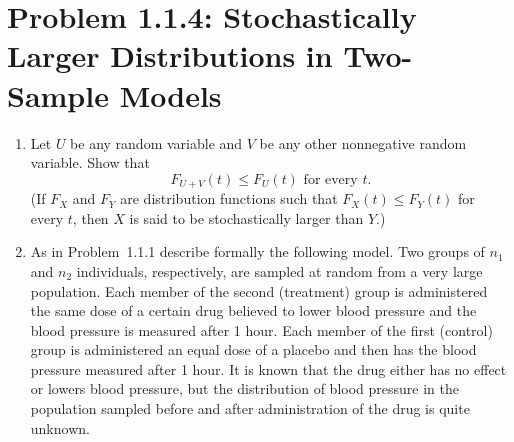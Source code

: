 \documentclass{amsbook}
\theoremstyle{definition}
\theoremstyle{remark}
\numberwithin{section}{chapter}
\numberwithin{equation}{chapter}
\begin{document}
\section{Problem 1.1.4: Stochastically Larger Distributions in Two-Sample Models}
\begin{enumerate}[label=(\alph*)]
\item Let $U$ be any random variable and $V$ be any other nonnegative random variable. Show that\[
F_{U+V}(t)\leqslant F_U(t)\text{ for every }t.
\](If $F_X$ and $F_Y$ are distribution functions such that $F_X(t)\leqslant F_Y(t)$ for every $t$, then $X$ is said to be stochastically larger than $Y$.)
\item As in Problem~1.1.1 describe formally the following model. Two groups of $n_1$ and $n_2$ individuals, respectively, are sampled at random from a very large population. Each member of the second (treatment) group is administered the same dose of a certain drug believed to lower blood pressure and the blood pressure is measured after 1 hour. Each member of the first (control) group is administered an equal dose of a placebo and then has the blood pressure measured after 1 hour. It is known that the drug either has no effect or lowers blood pressure, but the distribution of blood pressure in the population sampled before and after administration of the drug is quite unknown.
\end{enumerate}
\end{document}

